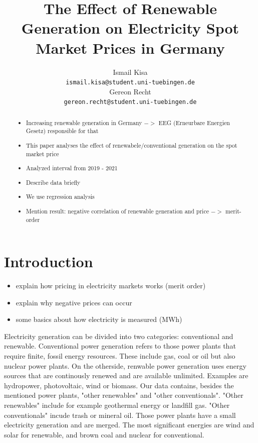 \documentclass{article}
\title{The Effect of Renewable Generation on Electricity Spot Market Prices in Germany}
\author{%
Ismail Kisa\\
\texttt{ismail.kisa@student.uni-tuebingen.de}\\
\And Gereon Recht\\
\texttt{gereon.recht@student.uni-tuebingen.de} \\
}
\begin{document}
\maketitle

\begin{abstract}
\begin{itemize}
    \item Increasing renewable generation in Germany $->$ EEG (Erneurbare Energien Gesetz) responsible for that
    \item This paper analyses the effect of renewabele/conventional generation on the spot market price
    \item Analyzed interval from 2019 - 2021
    \item Describe data briefly
    \item We use regression analysis
    \item Mention result: negative correlation of renewable generation and price $->$ merit-order
\end{itemize}


\end{abstract}

\section{Introduction}

\begin{itemize}
    \item explain how pricing in electricity markets works (merit order)
    \item explain why negative prices can occur
    \item some basics about how electricity is measured (MWh)
\end{itemize}

Electricity generation can be divided into two categories: conventional and renewable. Conventional power generation refers to those power plants that require finite, fossil energy resources. These include gas, coal or oil but also nuclear power plants. On the otherside, renwable power generation uses energy sources that are continously renewed and are available unlimited. Examples are hydropower, photovoltaic, wind or biomass. Our data contains, besides the mentioned power plants, "other renewables" and "other conventionals". "Other renewables" include for example geothermal energy or landfill gas. "Other conventionals" incude trash or mineral oil. Those power plants have a small electricity generation and are merged. The most significant energies are wind and solar for renewable, and brown coal and nuclear for conventional. 
\end{document}
